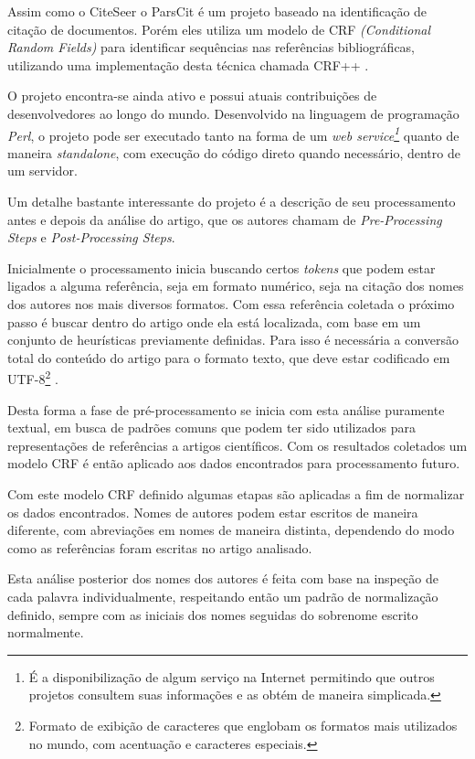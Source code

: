Assim como o CiteSeer o ParsCit é um projeto baseado na identificação de citação de documentos. Porém eles utiliza um modelo de CRF \textit{(Conditional Random Fields)} para identificar sequências nas referências bibliográficas, utilizando uma implementação desta técnica chamada CRF++ \cite{Councill-Giles-2008-ParsCit}.

O projeto encontra-se ainda ativo e possui atuais contribuições de desenvolvedores ao longo do mundo. Desenvolvido na linguagem de programação \textit{Perl}, o projeto pode ser executado tanto na forma de um \textit{web service\footnote{É a disponibilização de algum serviço na Internet permitindo que outros projetos consultem suas informações e as obtém de maneira simplicada.}} quanto de maneira \textit{standalone}, com execução do código direto quando necessário, dentro de um servidor.

Um detalhe bastante interessante do projeto é a descrição de seu processamento antes e depois da análise do artigo, que os autores chamam de \textit{Pre-Processing Steps} e \textit{Post-Processing Steps}.

Inicialmente o processamento inicia buscando certos \textit{tokens} que podem estar ligados a alguma referência, seja em formato numérico, seja na citação dos nomes dos autores nos mais diversos formatos. Com essa referência coletada o próximo passo é buscar dentro do artigo onde ela está localizada, com base em um conjunto de heurísticas previamente definidas. Para isso é necessária a conversão total do conteúdo do artigo para o formato texto, que deve estar codificado em UTF-8\footnote{Formato de exibição de caracteres que englobam os formatos mais utilizados no mundo, com acentuação e caracteres especiais.} \cite{Councill-Giles-2008-ParsCit}.

Desta forma a fase de pré-processamento se inicia com esta análise puramente textual, em busca de padrões comuns que podem ter sido utilizados para representações de referências a artigos científicos. Com os resultados coletados um modelo CRF é então aplicado aos dados encontrados para processamento futuro.

Com este modelo CRF definido algumas etapas são aplicadas a fim de normalizar os dados encontrados. Nomes de autores podem estar escritos de maneira diferente, com abreviações em nomes de maneira distinta, dependendo do modo como as referências foram escritas no artigo analisado.

Esta análise posterior dos nomes dos autores é feita com base na inspeção de cada palavra individualmente, respeitando então um padrão de normalização definido, sempre com as iniciais dos nomes seguidas do sobrenome escrito normalmente.

